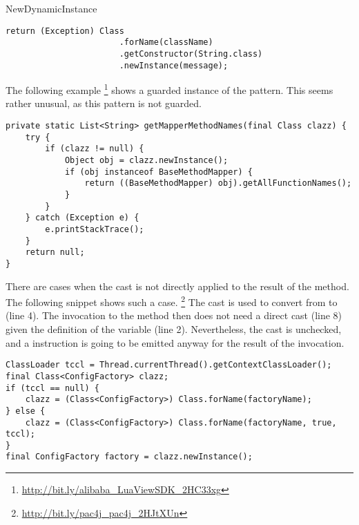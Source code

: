 \begin{pattern}{NewDynamicInstance}
\begin{verbatim}
return (Exception) Class
                       .forName(className)
                       .getConstructor(String.class)
                       .newInstance(message);
\end{verbatim}

The following example%
\footnote{\url{http://bit.ly/alibaba_LuaViewSDK_2HC33xg}}
shows a guarded instance of the \thisp{} pattern.
This seems rather unusual, as this pattern is not guarded.

\begin{verbatim}
private static List<String> getMapperMethodNames(final Class clazz) {
    try {
        if (clazz != null) {
            Object obj = clazz.newInstance();
            if (obj instanceof BaseMethodMapper) {
                return ((BaseMethodMapper) obj).getAllFunctionNames();
            }
        }
    } catch (Exception e) {
        e.printStackTrace();
    }
    return null;
}
\end{verbatim}

There are cases when the cast is not directly applied to the result of the  method.
The following snippet shows such a case.%
\footnote{\url{http://bit.ly/pac4j_pac4j_2HJtXUn}}
The cast is used to convert from  to  (line 4).
The invocation to the  method then does not need a direct cast (line 8) given the definition of the  variable (line 2).
Nevertheless, the cast is unchecked, and a  instruction is going to be emitted anyway for the result of the  invocation.

\begin{verbatim}
ClassLoader tccl = Thread.currentThread().getContextClassLoader();
final Class<ConfigFactory> clazz;
if (tccl == null) {
    clazz = (Class<ConfigFactory>) Class.forName(factoryName);
} else {
    clazz = (Class<ConfigFactory>) Class.forName(factoryName, true, tccl);
}
final ConfigFactory factory = clazz.newInstance();
\end{verbatim}



\end{pattern}
